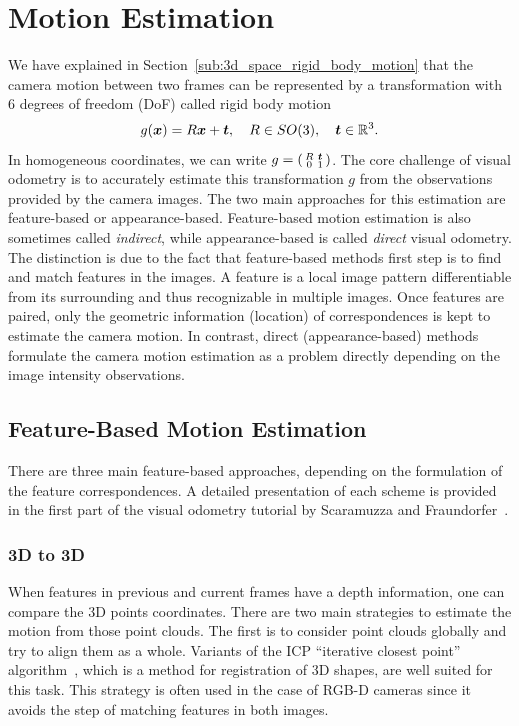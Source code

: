 \section{Motion Estimation}%
\label{sec:motion-estimation}

We have explained in Section~\ref{sub:3d_space_rigid_body_motion}
that the camera motion between two frames can be represented by
a transformation with 6 degrees of freedom (DoF) called rigid body motion
\[
	g(\bm{x}) = R\bm{x} + \bm{t},\quad R \in SO(3),\quad \bm{t} \in \mathbb{R}^3.
\]
In homogeneous coordinates, we can write
$g = \left(\begin{smallmatrix} R & \bm{t}\\ 0 & 1 \end{smallmatrix} \right)$.
The core challenge of visual odometry is to accurately estimate
this transformation $g$ from the observations provided by the camera images.
The two main approaches for this estimation are feature-based or appearance-based.
Feature-based motion estimation is also sometimes called \textit{indirect},
while appearance-based is called \textit{direct} visual odometry.
The distinction is due to the fact that feature-based methods
first step is to find and match features in the images.
A feature is a local image pattern differentiable from its surrounding
and thus recognizable in multiple images.
Once features are paired, only the geometric information (location)
of correspondences is kept to estimate the camera motion.
In contrast, direct (appearance-based) methods formulate the camera motion
estimation as a problem directly depending on the image intensity observations.


\subsection{Feature-Based Motion Estimation}%
\label{sub:feature-based}

There are three main feature-based approaches,
depending on the formulation of the feature correspondences.
A detailed presentation of each scheme is provided in the first part
of the visual odometry tutorial by Scaramuzza and Fraundorfer~\cite{scaramuzza2011visual}.

\subsubsection{3D to 3D}%
\label{ssub:3d_to_3d}
When features in previous and current frames have a depth information,
one can compare the 3D points coordinates.
There are two main strategies to estimate the motion from those point clouds.
The first is to consider point clouds globally and try to align them as a whole.
Variants of the ICP ``iterative closest point'' algorithm~\cite{besl1992method},
which is a method for registration of 3D shapes, are well suited for this task.
This strategy is often used in the case of RGB-D cameras since it avoids
the step of matching features in both images.

